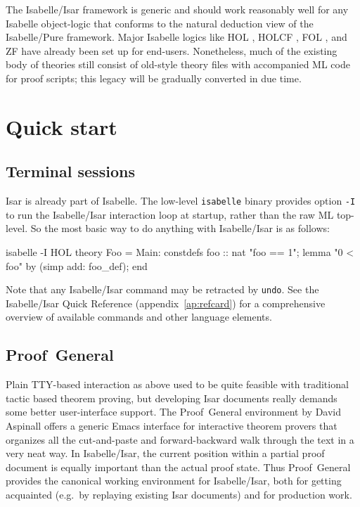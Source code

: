 \medskip The Isabelle/Isar framework is generic and should work reasonably
well for any Isabelle object-logic that conforms to the natural deduction view
of the Isabelle/Pure framework.  Major Isabelle logics like HOL
\cite{isabelle-HOL}, HOLCF \cite{MuellerNvOS99}, FOL \cite{isabelle-logics},
and ZF \cite{isabelle-ZF} have already been set up for end-users.
Nonetheless, much of the existing body of theories still consist of old-style
theory files with accompanied ML code for proof scripts; this legacy will be
gradually converted in due time.


\section{Quick start}

\subsection{Terminal sessions}

Isar is already part of Isabelle.  The low-level \texttt{isabelle} binary
provides option \texttt{-I} to run the Isabelle/Isar interaction loop at
startup, rather than the raw ML top-level.  So the most basic way to do
anything with Isabelle/Isar is as follows:
\begin{ttbox}
isabelle -I HOL\medskip
{}\medskip
theory Foo = Main:
constdefs foo :: nat  "foo == 1";
lemma "0 < foo" by (simp add: foo_def);
end
\end{ttbox}
Note that any Isabelle/Isar command may be retracted by \texttt{undo}.  See
the Isabelle/Isar Quick Reference (appendix~\ref{ap:refcard}) for a
comprehensive overview of available commands and other language elements.


\subsection{Proof~General}

Plain TTY-based interaction as above used to be quite feasible with
traditional tactic based theorem proving, but developing Isar documents really
demands some better user-interface support.  The Proof~General environment by
David Aspinall \cite{proofgeneral,Aspinall:TACAS:2000} offers a generic Emacs
interface for interactive theorem provers that organizes all the cut-and-paste
and forward-backward walk through the text in a very neat way.  In
Isabelle/Isar, the current position within a partial proof document is equally
important than the actual proof state.  Thus Proof~General provides the
canonical working environment for Isabelle/Isar, both for getting acquainted
(e.g.\ by replaying existing Isar documents) and for production work.


